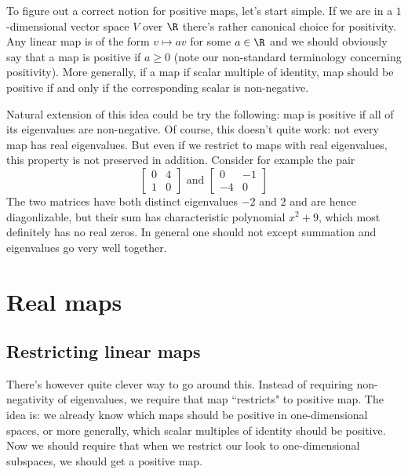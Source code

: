 To figure out a correct notion for positive maps, let's start simple. If we are in a $1$-dimensional vector space $V$ over $\R$ there's rather canonical choice for positivity. Any linear map is of the form $v \mapsto a v$ for some $a \in \R$ and we should obviously say that a map is positive if $a \geq 0$ (note our non-standard terminology concerning positivity). More generally, if a map if scalar multiple of identity, map should be positive if and only if the corresponding scalar is non-negative.

Natural extension of this idea could be try the following: map is positive if all of its eigenvalues are non-negative. Of course, this doesn't quite work: not every map has real eigenvalues. But even if we restrict to maps with real eigenvalues, this property is not preserved in addition. Consider for example the pair
\[
	\begin{bmatrix}
		0 & 4 \\
		1 & 0
	\end{bmatrix}
	\text{ and }
	\begin{bmatrix}
		0 & -1 \\
		-4 & 0
	\end{bmatrix}
\]
The two matrices have both distinct eigenvalues $- 2$ and $2$ and are hence diagonlizable, but their sum has characteristic polynomial $x^2 + 9$, which most definitely has no real zeros. In general one should not except summation and eigenvalues go very well together.

\section{Real maps}

\subsection{Restricting linear maps}

There's however quite clever way to go around this. Instead of requiring non-negativity of eigenvalues, we require that map ``restricts" to positive map. The idea is: we already know which maps should be positive in one-dimensional spaces, or more generally, which scalar multiples of identity should be positive. Now we should require that when we restrict our look to one-dimensional subspaces, we should get a positive map.


